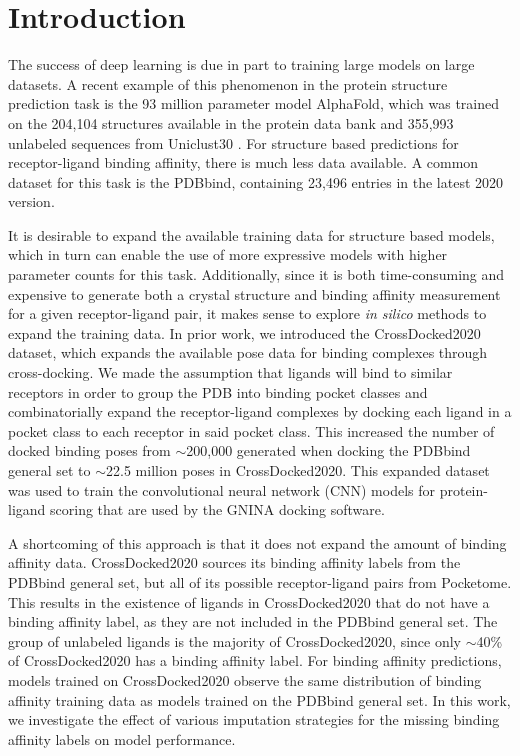 \documentclass[journal=jcim,manuscript=article]{achemso}
\begin{document}

\section{Introduction}

The success of deep learning is due in part to training large models on large datasets.
A recent example of this phenomenon in the protein structure prediction task is the 93 million parameter model AlphaFold, which was trained on the 204,104 structures available in the protein data bank and 355,993 unlabeled sequences from Uniclust30 \cite{alphafold}.
For structure based predictions for receptor-ligand binding affinity, there is much less data available.
A common dataset for this task is the PDBbind,\cite{pdbbind2016} containing 23,496 entries in the latest 2020 version.

It is desirable to expand the available training data for structure based models, which in turn can enable the use of more expressive models with higher parameter counts for this task.
Additionally, since it is both time-consuming and expensive to generate both a crystal structure and binding affinity measurement for a given receptor-ligand pair, it makes sense to explore \textit{in silico} methods to expand the training data.
In prior work, we introduced the CrossDocked2020 dataset, which expands the available pose data for binding complexes through cross-docking\cite{crossdocked2020}.
We made the assumption that ligands will bind to similar receptors in order to group the PDB into binding pocket classes and combinatorially expand the receptor-ligand complexes by docking each ligand in a pocket class to each receptor in said pocket class.
This increased the number of docked binding poses from $\sim$200,000 generated when docking the PDBbind general set to $\sim$22.5 million poses in CrossDocked2020\cite{crossdocked2020}. This expanded dataset was used to train the convolutional neural network (CNN) models for protein-ligand scoring\cite{ragoza2017protein} that are used by the GNINA docking software.\cite{mcnutt2021gnina}

A shortcoming of this approach is that it does not expand the amount of binding affinity data.
CrossDocked2020 sources its binding affinity labels from the PDBbind general set, but all of its possible receptor-ligand pairs from Pocketome.\cite{pocketome}
This results in the existence of ligands in CrossDocked2020 that do not have a binding affinity label, as they are not included in the PDBbind general set.
The group of unlabeled ligands is the majority of CrossDocked2020, since only $\sim$40\% of CrossDocked2020 has a binding affinity label.
For binding affinity predictions, models trained on CrossDocked2020 observe the same distribution of binding affinity training data as models trained on the PDBbind general set.
In this work, we investigate the effect of various imputation strategies for the missing binding affinity labels on model performance.
\end{document}
